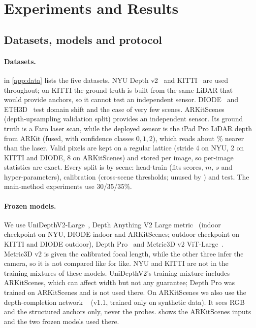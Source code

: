 \section{Experiments and Results}
\label{sec:experiments}

\subsection{Datasets, models and protocol}
\label{sec:protocol}

\paragraph{Datasets.}
 in \cref{app:data} lists the five datasets.
NYU Depth v2~\cite{silberman2012nyu} and KITTI~\cite{geiger2012kitti} are used throughout; on KITTI the ground truth is built from the same LiDAR that would provide anchors, so it cannot test an independent sensor.
DIODE~\cite{vasiljevic2019diode} and ETH3D~\cite{schops2017eth3d} test domain shift and the case of very few scenes.
ARKitScenes~\cite{baruch2021arkitscenes} (depth-upsampling validation split) provides an independent sensor.
Its ground truth is a Faro laser scan, while the deployed sensor is the iPad Pro LiDAR depth from ARKit (fused, with confidence classes $0,1,2$), which reads about \NumArkIpadOffset\% nearer than the laser.
Valid pixels are kept on a regular lattice (stride 4 on NYU, 2 on KITTI and DIODE, 8 on ARKitScenes) and stored per image, so per-image statistics are exact.
Every split is by scene: head-train (fits scores, $m$, $s$ and hyper-parameters), calibration (cross-scene thresholds; unused by \mDual) and test.
The main-method experiments use 30/35/35\%.


\paragraph{Frozen models.}
We use UniDepthV2-Large~\cite{piccinelli2025unidepthv2}, Depth Anything V2 Large metric~\cite{yang2024dav2} (indoor checkpoint on NYU, DIODE indoor and ARKitScenes; outdoor checkpoint on KITTI and DIODE outdoor), Depth Pro~\cite{bochkovskii2025depthpro} and Metric3D v2 ViT-Large~\cite{hu2024metric3dv2}.
Metric3D v2 is given the calibrated focal length, while the other three infer the camera, so it is not compared like for like.
NYU and KITTI are not in the training mixtures of these models.
UniDepthV2's training mixture includes ARKitScenes, which can affect width but not any guarantee; Depth Pro was trained on ARKitScenes and is not used there.
On ARKitScenes we also use the depth-completion network \omnidc~\cite{zuo2025omnidc} (v1.1, trained only on synthetic data).
It sees RGB and the structured anchors only, never the probes.
 shows the ARKitScenes inputs and the two frozen models used there.

